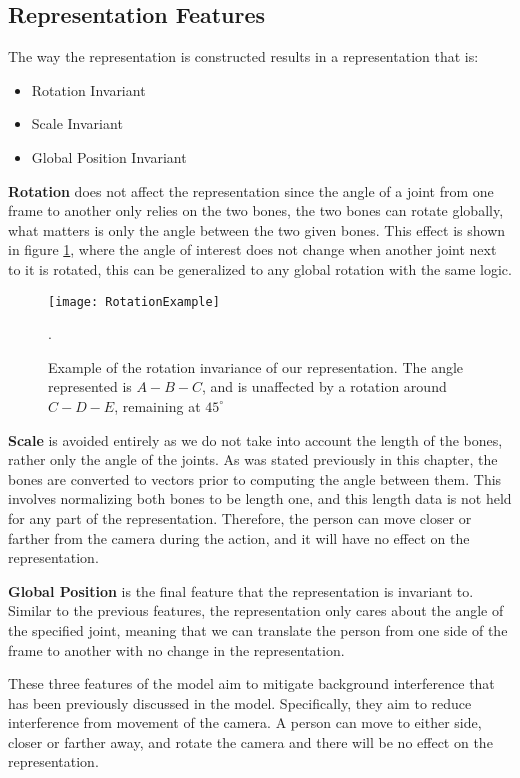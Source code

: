 \subsection{Representation Features}

The way the representation is constructed results in a representation that is:

\begin{itemize}
	\item Rotation Invariant
	\item Scale Invariant
	\item Global Position Invariant
\end{itemize}

\textbf{Rotation} does not affect the representation since the angle of a joint from one frame to another only relies on the two bones, the two bones can rotate globally, what matters is only the angle between the two given bones. This effect is shown in figure \ref{fig:rotation-invariant}, where the angle of interest does not change when another joint next to it is rotated, this can be generalized to any global rotation with the same logic.

\begin{figure}[ht]
	\texttt{[image: RotationExample]}
	\centering
	\caption{Example of the rotation invariance of our representation. The angle represented is $A-B-C$, and is unaffected by a rotation around $C-D-E$, remaining at $45^{\circ}$}.
	\label{fig:rotation-invariant}
\end{figure}

\textbf{Scale} is avoided entirely as we do not take into account the length of the bones, rather only the angle of the joints. As was stated previously in this chapter, the bones are converted to vectors prior to computing the angle between them. This involves normalizing both bones to be length one, and this length data is not held for any part of the representation. Therefore, the person can move closer or farther from the camera during the action, and it will have no effect on the representation.

\textbf{Global Position} is the final feature that the representation is invariant to. Similar to the previous features, the representation only cares about the angle of the specified joint, meaning that we can translate the person from one side of the frame to another with no change in the representation.

These three features of the model aim to mitigate background interference that has been previously discussed in the model. Specifically, they aim to reduce interference from movement of the camera. A person can move to either side, closer or farther away, and rotate the camera  and there will be no effect on the representation.

